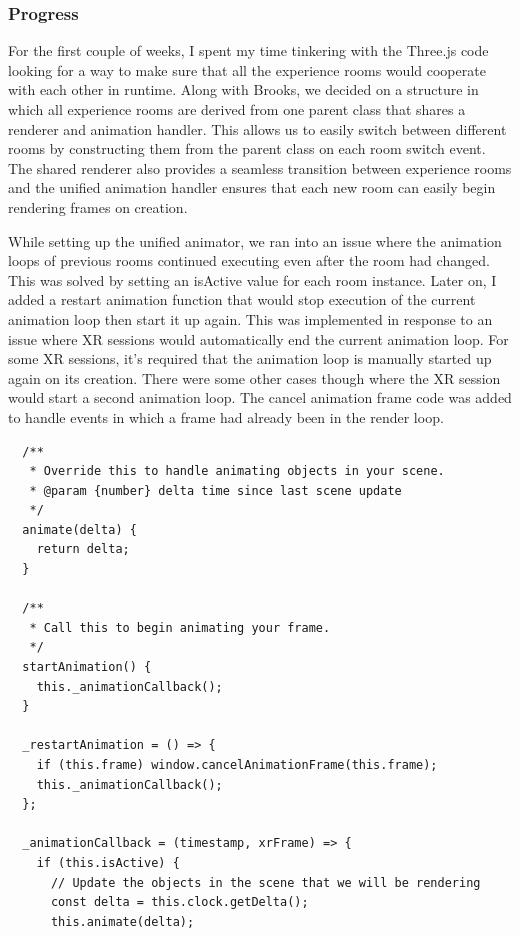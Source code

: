 \documentclass[onecolumn, draftclsnofoot,10pt, compsoc]{IEEEtran}
\begin{document}
    \subsubsection{Progress}
    
    For the first couple of weeks, I spent my time tinkering with the Three.js code looking for a way to make sure that all the experience rooms would cooperate with each other in runtime. Along with Brooks, we decided on a structure in which all experience rooms are derived from one parent class that shares a renderer and animation handler. This allows us to easily switch between different rooms by constructing them from the parent class on each room switch event. The shared renderer also provides a seamless transition between experience rooms and the unified animation handler ensures that each new room can easily begin rendering frames on creation. 
    
    While setting up the unified animator, we ran into an issue where the animation loops of previous rooms continued executing even after the room had changed. This was solved by setting an isActive value for each room instance. Later on, I added a restart animation function that would stop execution of the current animation loop then start it up again. This was implemented in response to an issue where XR sessions would automatically end the current animation loop. For some XR sessions, it's required that the animation loop is manually started up again on its creation. There were some other cases though where the XR session would start a second animation loop. The cancel animation frame code was added to handle events in which a frame had already been in the render loop.
    \begin{lstlisting}
  /**
   * Override this to handle animating objects in your scene.
   * @param {number} delta time since last scene update
   */
  animate(delta) {
    return delta;
  }

  /**
   * Call this to begin animating your frame.
   */
  startAnimation() {
    this._animationCallback();
  }

  _restartAnimation = () => {
    if (this.frame) window.cancelAnimationFrame(this.frame);
    this._animationCallback();
  };

  _animationCallback = (timestamp, xrFrame) => {
    if (this.isActive) {
      // Update the objects in the scene that we will be rendering
      const delta = this.clock.getDelta();
      this.animate(delta);
    \end{lstlisting}
    
\end{document}
